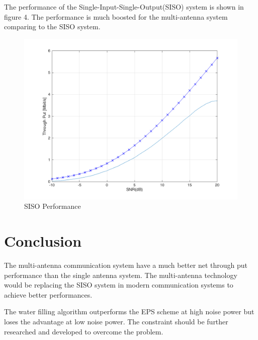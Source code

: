 \documentclass{article}
\begin{document}
The performance of the Single-Input-Single-Output(SISO) system is shown in figure 4. The performance is much boosted for the multi-antenna system comparing to the SISO system.
\begin{figure}[ht]
\centering
\includegraphics[scale=0.25]{FadingSISO.png}
\caption{SISO Performance}
\label{fig:WFvsEPS}
\end{figure}


\section{Conclusion}
The multi-antenna communication system have a much better net through put performance than the single antenna system.
The multi-antenna technology would be replacing the SISO system in modern communication systems to achieve better performances.

The water filling algorithm outperforms the EPS scheme at high noise power but loses the advantage at low noise power.
The constraint should be further researched and developed to overcome the problem.
\end{document}

